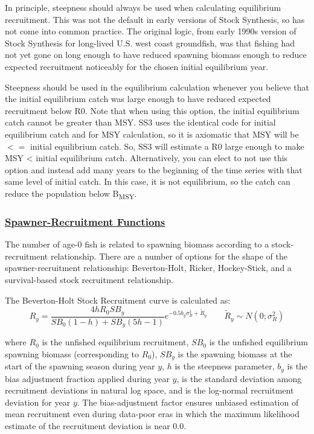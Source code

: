 In principle, steepness should always be used when calculating equilibrium recruitment. This was not the default in early versions of Stock Synthesis, so has not come into common practice. The original logic, from early 1990s version of Stock Synthesis for long-lived U.S. west coast groundfish, was that fishing had not yet gone on long enough to have reduced spawning biomass enough to reduce expected recruitment noticeably for the chosen initial equilibrium year.

Steepness should be used in the equilibrium calculation whenever you believe that the initial equilibrium catch was large enough to have reduced expected recruitment below R0. Note that when using this option, the initial equilibrium catch cannot be greater than MSY. SS3 uses the identical code for initial equilibrium catch and for MSY calculation, so it is axiomatic that MSY will be $<=$ initial equilibrium catch. So, SS3 will estimate a R0 large enough to make MSY < initial equilibrium catch. Alternatively, you can elect to not use this option and instead add many years to the beginning of the time series with that same level of initial catch. In this case, it is not equilibrium, so the catch can reduce the population below B\textsubscript{MSY}.

\hypertarget{SRRFunc}{}
\subsubsection[Spawner-Recruitment Functions]{\protect\hyperlink{SRRFunc}{Spawner-Recruitment Functions}}
The number of age-0 fish is related to spawning biomass according to a stock-recruitment relationship. There are a number of options for the shape of the spawner-recruitment relationship: Beverton-Holt, Ricker, Hockey-Stick, and a survival-based stock recruitment relationship.

\hypertarget{BH}{}
The Beverton-Holt Stock Recruitment curve is calculated as:
\begin{equation}{R_y = \frac{4hR_0SB_y}{SB_0(1-h)+SB_y(5h-1)}e^{-0.5b_y\sigma^2_R+\tilde{R}_y}\qquad  \tilde{R}_y\sim N(0;\sigma^2_R)}
\end{equation}

where $R_0$ is the unfished equilibrium recruitment, $SB_0$ is the unfished equilibrium spawning biomass (corresponding to $R_0$), $SB_y$ is the spawning biomass at the start of the spawning season during year $y$, $h$ is the steepness parameter, $b_y$ is the bias adjustment fraction applied during year $y$, is the standard deviation among recruitment deviations in natural log space, and is the log-normal recruitment deviation for year $y$. The bias-adjustment factor \citep{methot-adjusting-2011} ensures unbiased estimation of mean recruitment even during data-poor eras in which the maximum likelihood estimate of the recruitment deviation is near 0.0.

